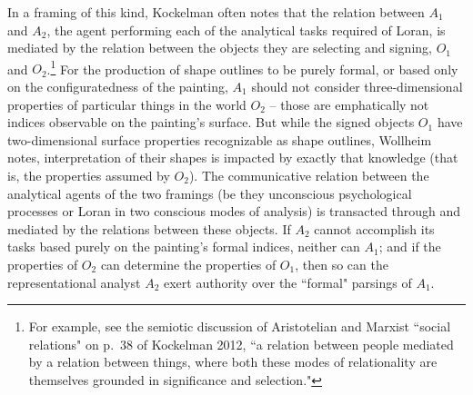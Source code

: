 In a framing of this kind, Kockelman often notes that the relation between $A_1$ and $A_2$, the agent performing each of the analytical tasks required of Loran, is mediated by the relation between the objects they are selecting and signing, $O_1$ and $O_2$.\footnote{For example, see the semiotic discussion of Aristotelian and Marxist ``social relations" on p.\ 38 of Kockelman 2012, ``a relation between people mediated by a relation between things, where both these modes of relationality are themselves grounded in significance and selection."}  For the production of shape outlines to be purely formal, or based only on the configuratedness of the painting, $A_1$ should not consider three-dimensional properties of particular things in the world $O_2$ -- those are emphatically not indices observable on the painting's surface.  But while the signed objects $O_1$ have two-dimensional surface properties recognizable as shape outlines, Wollheim notes, interpretation of their shapes is impacted by exactly that knowledge (that is, the properties assumed by $O_2$).  The communicative relation between the analytical agents of the two framings (be they unconscious psychological processes or Loran in two conscious modes of analysis) is transacted through and mediated by the relations between these objects.  If $A_2$ cannot accomplish its tasks based purely on the painting's formal indices, neither can $A_1$; and if the properties of $O_2$ can determine the properties of $O_1$, then so can the representational analyst $A_2$ exert authority over the ``formal" parsings of $A_1$.

